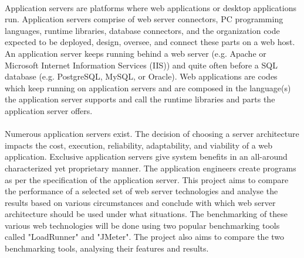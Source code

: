 \documentclass[a4paper, onecolumn, oneside, 11pt, wide, floatssmall]{mwrep}
\begin{document}
\paragraph{}
Application servers are platforms where web applications or desktop applications run. Application servers comprise of web server connectors, PC programming languages, runtime libraries, database connectors, and the organization code expected to be deployed, design, oversee, and connect these parts on a web host. An application server keeps running behind a web server (e.g. Apache or Microsoft Internet Information Services (IIS)) and quite often before a SQL database (e.g. PostgreSQL, MySQL, or Oracle). Web applications are codes which keep running on application servers and are composed in the language(s) the application server supports and call the runtime libraries and parts the application server offers.
\paragraph{}
Numerous application servers exist. The decision of choosing a server architecture impacts the cost, execution, reliability, adaptability, and viability of a web application. Exclusive application servers give system benefits in an all-around characterized yet proprietary manner. The application engineers create programs as per the specification of the application server. This project aims to compare the performance of a selected set of web server technologies and analyse the results based on various circumstances and conclude with which web server architecture should be used under what situations. The benchmarking of these various web technologies will be done using two popular benchmarking tools called "LoadRunner" and "JMeter". The project also aims to compare the two benchmarking tools, analysing their features and results.
\end{document}
